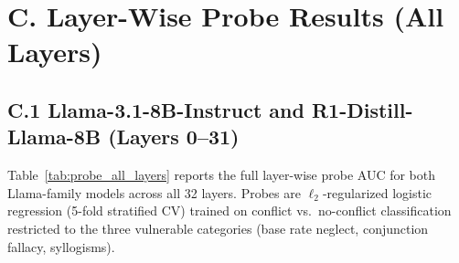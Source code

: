 \documentclass[accepted]{article}
\begin{document}

\section*{C. Layer-Wise Probe Results (All Layers)}
\label{sec:appendix_probes}

\subsection*{C.1 Llama-3.1-8B-Instruct and R1-Distill-Llama-8B (Layers 0--31)}

Table~\ref{tab:probe_all_layers} reports the full layer-wise probe
AUC for both Llama-family models across all 32 layers.  Probes are
$\ell_2$-regularized logistic regression (5-fold stratified CV)
trained on conflict vs.\ no-conflict classification restricted to the
three vulnerable categories (base rate neglect, conjunction fallacy,
syllogisms).
\end{document}
